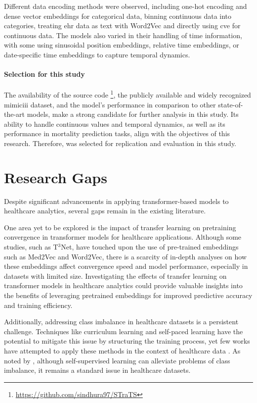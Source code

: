 Different data encoding methods were observed, including one-hot encoding and dense vector embeddings for categorical data, binning continuous data into categories, treating \gls{ehr} data as text with Word2Vec and directly using \gls{cve} for continuous data. The models also varied in their handling of time information, with some using sinusoidal position embeddings, relative time embeddings, or date-specific time embeddings to capture temporal dynamics.

\paragraph{Selection for this study}

The availability of the source code \footnote{\url{https://github.com/sindhura97/STraTS}}, the publicly available and widely recognized \gls{mimiciii} dataset, and the model's performance in comparison to other state-of-the-art models, make  a strong candidate for further analysis in this study. Its ability to handle continuous values and temporal dynamics, as well as its performance in mortality prediction tasks, align with the objectives of this research. Therefore,  was selected for replication and evaluation in this study.


\section{Research Gaps}

Despite significant advancements in applying transformer-based models to healthcare analytics, several gaps remain in the existing literature.

One area yet to be explored is the impact of transfer learning on pretraining convergence in transformer models for healthcare applications. Although some studies, such as T$^3$Net, have touched upon the use of pre-trained embeddings such as Med2Vec and Word2Vec, there is a scarcity of in-depth analyses on how these embeddings affect convergence speed and model performance, especially in datasets with limited size. Investigating the effects of transfer learning on transformer models in healthcare analytics could provide valuable insights into the benefits of leveraging pretrained embeddings for improved predictive accuracy and training efficiency.

Additionally, addressing class imbalance in healthcare datasets is a persistent challenge. Techniques like curriculum learning and self-paced learning have the potential to mitigate this issue by structuring the training process, yet few works have attempted to apply these methods in the context of healthcare data \cite{CurriculumLearning,SelfPacedLearning}. As noted by \textcite{PretrainingMedicalSurvey2023}, although self-supervised learning can alleviate problems of class imbalance, it remains a standard issue in healthcare datasets.

